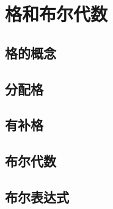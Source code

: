 \section{格和布尔代数}

\subsection{格的概念}

\subsection{分配格}

\subsection{有补格}

\subsection{布尔代数}

\subsection{布尔表达式}